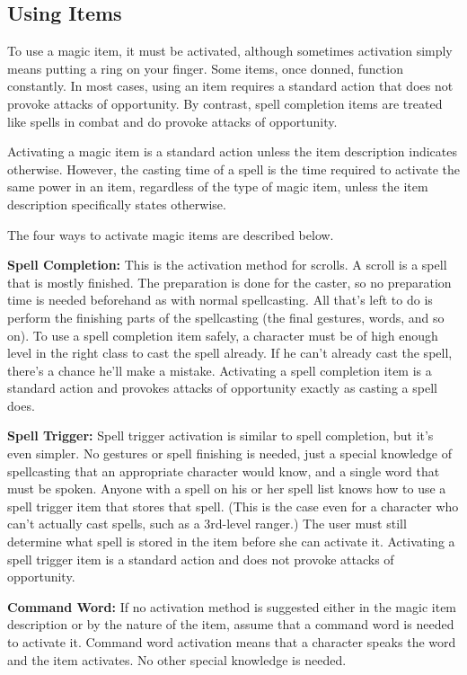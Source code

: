 \subsection{Using Items}
To use a magic item, it must be activated, although sometimes activation simply means putting a ring on your finger. Some items, once donned, function constantly. In most cases, using an item requires a standard action that does not provoke attacks of opportunity. By contrast, spell completion items are treated like spells in combat and do provoke attacks of opportunity.

Activating a magic item is a standard action unless the item description indicates otherwise. However, the casting time of a spell is the time required to activate the same power in an item, regardless of the type of magic item, unless the item description specifically states otherwise.

The four ways to activate magic items are described below.

\textbf{Spell Completion:} This is the activation method for scrolls. A scroll is a spell that is mostly finished. The preparation is done for the caster, so no preparation time is needed beforehand as with normal spellcasting. All that's left to do is perform the finishing parts of the spellcasting (the final gestures, words, and so on). To use a spell completion item safely, a character must be of high enough level in the right class to cast the spell already. If he can't already cast the spell, there's a chance he'll make a mistake. Activating a spell completion item is a standard action and provokes attacks of opportunity exactly as casting a spell does.

\textbf{Spell Trigger:} Spell trigger activation is similar to spell completion, but it's even simpler. No gestures or spell finishing is needed, just a special knowledge of spellcasting that an appropriate character would know, and a single word that must be spoken. Anyone with a spell on his or her spell list knows how to use a spell trigger item that stores that spell. (This is the case even for a character who can't actually cast spells, such as a 3rd-level ranger.) The user must still determine what spell is stored in the item before she can activate it. Activating a spell trigger item is a standard action and does not provoke attacks of opportunity.

\textbf{Command Word:} If no activation method is suggested either in the magic item description or by the nature of the item, assume that a command word is needed to activate it. Command word activation means that a character speaks the word and the item activates. No other special knowledge is needed.


